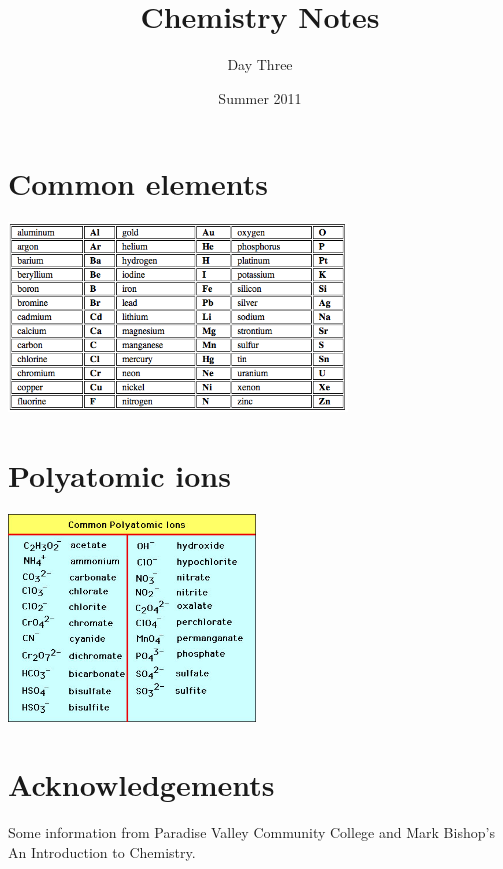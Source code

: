 \documentclass[]{article}
\title{Chemistry Notes}
\author{Day Three}
\date{Summer 2011}
\begin{document}
\maketitle

\section{Common elements}
\vspace{5mm}
\includegraphics[width=9cm]{elements.png}

\section{Polyatomic ions}
\vspace{5mm}
\includegraphics[height=5.5cm]{polyions.jpg}

\section{Acknowledgements}

Some information from Paradise Valley Community College and Mark Bishop's An Introduction to Chemistry.
\end{document}
